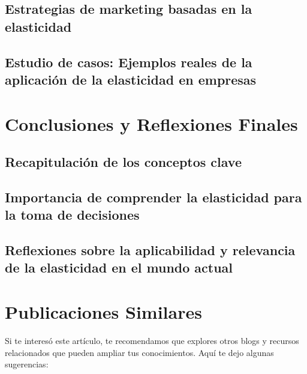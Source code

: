 \documentclass[
  a4paper,
]{article}
\begin{document}
\subsection{Estrategias de marketing basadas en la
elasticidad}\label{estrategias-de-marketing-basadas-en-la-elasticidad}

\subsection{Estudio de casos: Ejemplos reales de la aplicación de la
elasticidad en
empresas}\label{estudio-de-casos-ejemplos-reales-de-la-aplicaciuxf3n-de-la-elasticidad-en-empresas}

\section{Conclusiones y Reflexiones
Finales}\label{conclusiones-y-reflexiones-finales}

\subsection{Recapitulación de los conceptos
clave}\label{recapitulaciuxf3n-de-los-conceptos-clave}

\subsection{Importancia de comprender la elasticidad para la toma de
decisiones}\label{importancia-de-comprender-la-elasticidad-para-la-toma-de-decisiones}

\subsection{Reflexiones sobre la aplicabilidad y relevancia de la
elasticidad en el mundo
actual}\label{reflexiones-sobre-la-aplicabilidad-y-relevancia-de-la-elasticidad-en-el-mundo-actual}

\section{Publicaciones Similares}\label{publicaciones-similares}

Si te interesó este artículo, te recomendamos que explores otros blogs y
recursos relacionados que pueden ampliar tus conocimientos. Aquí te dejo
algunas sugerencias:
\end{document}
